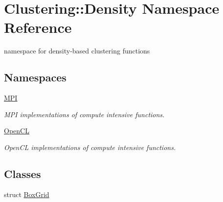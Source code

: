 \hypertarget{namespaceClustering_1_1Density}{\section{Clustering\-:\-:Density Namespace Reference}
\label{namespaceClustering_1_1Density}
}


namespace for density-\/based clustering functions  


\subsection*{Namespaces}
\begin{DoxyCompactItemize}
\item 
\hyperlink{namespaceClustering_1_1Density_1_1MPI}{M\-P\-I}
\begin{DoxyCompactList}\small\item\em M\-P\-I implementations of compute intensive functions. \end{DoxyCompactList}\item 
\hyperlink{namespaceClustering_1_1Density_1_1OpenCL}{Open\-C\-L}
\begin{DoxyCompactList}\small\item\em Open\-C\-L implementations of compute intensive functions. \end{DoxyCompactList}\end{DoxyCompactItemize}
\subsection*{Classes}
\begin{DoxyCompactItemize}
\item 
struct \hyperlink{namespaceClustering_1_1Density_structClustering_1_1Density_1_1BoxGrid}{Box\-Grid}
\end{DoxyCompactItemize}
